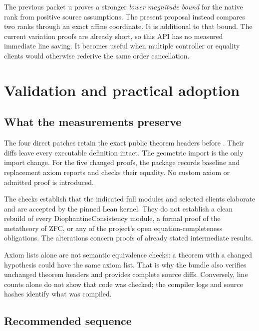 \documentclass[11pt,a4paper]{article}
\newcommand{\code}[1]{\texttt{\detokenize{#1}}}
\begin{document}
The previous packet u proves a stronger \emph{lower magnitude bound} for the native rank from positive source assumptions. The present proposal instead compares two ranks through an exact affine coordinate. It is additional to that bound. The current variation proofs are already short, so this API has no measured immediate line saving. It becomes useful when multiple controller or equality clients would otherwise rederive the same order cancellation.

\section{Validation and practical adoption}



\subsection{What the measurements preserve}

The four direct patches retain the exact public theorem headers before \code{:=}. Their diffs leave every executable definition intact. The geometric import is the only import change. For the five changed proofs, the package records baseline and replacement axiom reports and checks their equality. No custom axiom or admitted proof is introduced.

The checks establish that the indicated full modules and selected clients elaborate and are accepted by the pinned Lean kernel. They do not establish a clean rebuild of every DiophantineConsistency module, a formal proof of the metatheory of ZFC, or any of the project's open equation-completeness obligations. The alterations concern proofs of already stated intermediate results.

Axiom lists alone are not semantic equivalence checks: a theorem with a changed hypothesis could have the same axiom list. That is why the bundle also verifies unchanged theorem headers and provides complete source diffs. Conversely, line counts alone do not show that code was checked; the compiler logs and source hashes identify what was compiled.

\subsection{Recommended sequence}
\end{document}
